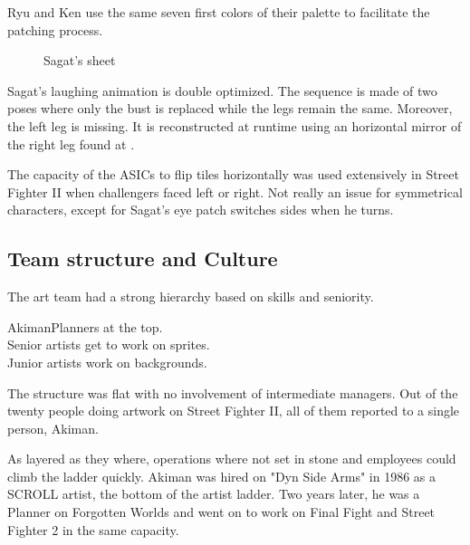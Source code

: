 Ryu and Ken use the same seven first colors of their palette to facilitate the patching process. 






 \begin{figure}[H]
\caption*{Sagat's sheet}
\end{figure}

Sagat's laughing animation is double optimized. The sequence is made of two poses where only the bust is replaced while the legs remain the same. Moreover, the left leg is missing. It is reconstructed at runtime using an horizontal mirror of the right leg found at .

\begin{trivia}
The capacity of the ASICs to flip tiles horizontally was used extensively in Street Fighter II when challengers faced left or right. Not really an issue for symmetrical characters, except for Sagat's eye patch switches sides when he turns.
\end{trivia}

\pagebreak

\subsection{Team structure and Culture}

The art team had a strong hierarchy based on skills and seniority.

\begin{q}{Akiman\cite{akiman2003}}Planners at the top.\\
Senior artists get to work on sprites. \\
Junior artists work on backgrounds.
\end{q}

The structure was flat with no involvement of intermediate managers. Out of the twenty people doing artwork on Street Fighter II, all of them reported to a single person, Akiman\cite{sf2_oral_history}.




As layered as they where, operations where not set in stone and employees could climb the ladder quickly. Akiman was hired on "Dyn Side Arms" in 1986 as a SCROLL artist, the bottom of the artist ladder. Two years later, he was a Planner on Forgotten Worlds and went on to work on Final Fight and Street Fighter 2 in the same capacity.

